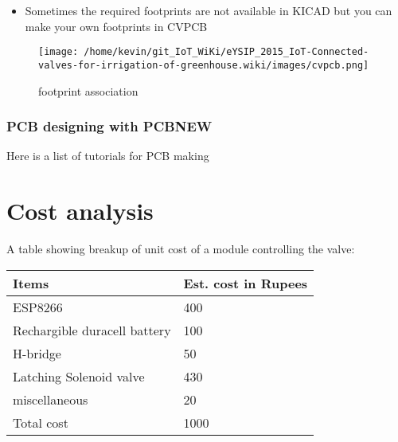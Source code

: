 \documentclass[16pt]{article}
\begin{document}
\begin{itemize}

\item
  Sometimes the required footprints are not available in KICAD but you
  can make your own footprints in CVPCB
\end{itemize}

\begin{figure}

\texttt{[image: /home/kevin/git\_IoT\_WiKi/eYSIP\_2015\_IoT-Connected-valves-for-irrigation-of-greenhouse.wiki/images/cvpcb.png]}
\caption{footprint association}
\end{figure}
\vspace{0.4cm}

\subsubsection{PCB designing with
PCBNEW}
Here is a list of tutorials for PCB making

\vspace{25cm}


\hfill 



\section{Cost analysis}

A table showing breakup of unit cost of a module controlling the valve: 

\vspace{0.5cm}
\begin{tabular}{|m{5cm}|m{3.5cm}|}
	\hline
	{\bf Items} & {\bf Est. cost in Rupees}\\ \hline
	ESP8266 & 400 \\ \hline
	Rechargible duracell battery & 100 \\ \hline
	H-bridge & 50 \\ \hline 
	Latching Solenoid valve & 430 \\ \hline
	miscellaneous & 20 \\ \hline
	Total cost & 1000 \\ \hline 
\end{tabular} 
\end{document}
